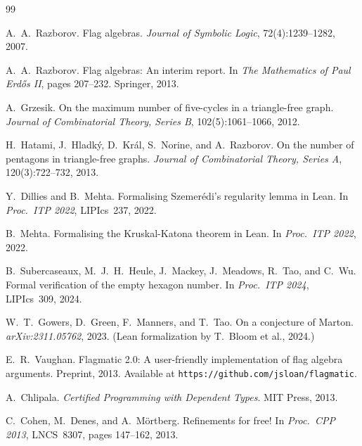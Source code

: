 \documentclass{article}
\begin{document}

\begin{thebibliography}{99}

A.~A.~Razborov.
\newblock Flag algebras.
\newblock \textit{Journal of Symbolic Logic}, 72(4):1239--1282, 2007.

A.~A.~Razborov.
\newblock Flag algebras: An interim report.
\newblock In \textit{The Mathematics of Paul Erd\H{o}s II}, pages 207--232.
  Springer, 2013.

A.~Grzesik.
\newblock On the maximum number of five-cycles in a triangle-free graph.
\newblock \textit{Journal of Combinatorial Theory, Series B},
  102(5):1061--1066, 2012.

H.~Hatami, J.~Hladk\'{y}, D.~Kr\'{a}l, S.~Norine, and A.~Razborov.
\newblock On the number of pentagons in triangle-free graphs.
\newblock \textit{Journal of Combinatorial Theory, Series A},
  120(3):722--732, 2013.

Y.~Dillies and B.~Mehta.
\newblock Formalising Szemer\'{e}di's regularity lemma in Lean.
\newblock In \textit{Proc.\ ITP 2022}, LIPIcs~237, 2022.

B.~Mehta.
\newblock Formalising the Kruskal-Katona theorem in Lean.
\newblock In \textit{Proc.\ ITP 2022}, 2022.

B.~Subercaseaux, M.~J.~H.~Heule, J.~Mackey, J.~Meadows, R.~Tao, and
  C.~Wu.
\newblock Formal verification of the empty hexagon number.
\newblock In \textit{Proc.\ ITP 2024}, LIPIcs~309, 2024.

W.~T.~Gowers, D.~Green, F.~Manners, and T.~Tao.
\newblock On a conjecture of Marton.
\newblock \textit{arXiv:2311.05762}, 2023.
\newblock (Lean formalization by T.~Bloom et al., 2024.)

E.~R.~Vaughan.
\newblock Flagmatic 2.0: A user-friendly implementation of flag algebra
  arguments.
\newblock Preprint, 2013. Available at \texttt{https://github.com/jsloan/flagmatic}.

A.~Chlipala.
\newblock \textit{Certified Programming with Dependent Types}.
\newblock MIT Press, 2013.

C.~Cohen, M.~Denes, and A.~M\"{o}rtberg.
\newblock Refinements for free!
\newblock In \textit{Proc.\ CPP 2013}, LNCS~8307, pages 147--162, 2013.


\end{thebibliography}
\end{document}
